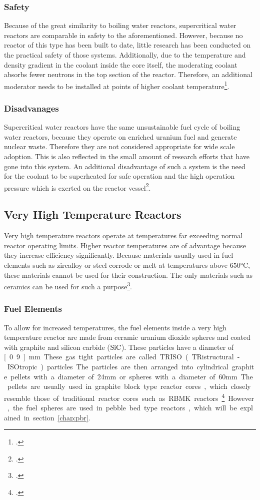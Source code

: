 \subsubsection{Safety}
Because of the great similarity to boiling water reactors, supercritical water reactors are comparable
in safety to the aforementioned. However, because no reactor of this type has been built to date,
little research has been conducted on the practical safety of those systems.
Additionally, due to the temperature and density gradient in the coolant inside the core itself,
the moderating coolant absorbs fewer neutrons in the top section of the reactor. Therefore,
an additional moderator needs to be installed at points of higher coolant temperature\footcite[52-53]{T4Gen}.
\subsubsection{Disadvanages}
Supercritical water reactors have the same unsustainable fuel cycle of boiling water reactors,
because they operate on enriched uranium fuel and generate nuclear waste. Therefore they are
not considered appropriate for wide scale adoption. This is also reflected in the small amount
of research efforts that have gone into this system.
An additional disadvantage of such a system is the need for the coolant to be superheated for
safe operation and the high operation pressure which is exerted on the reactor vessel\footcite[52-53]{T4Gen}.
\pagebreak
\subsection{Very High Temperature Reactors}
Very high temperature reactors operate at temperatures far exceeding normal reactor operating limits.
Higher reactor temperatures are of advantage because they increase efficiency significantly.
Because materials usually used in fuel elements such as zircalloy or steel corrode or melt at temperatures
above 650°C, these materials cannot be used for their construction.
The only materials such as ceramics can be used for such a purpose\footcite[55]{T4Gen}.
\subsubsection{Fuel Elements}
To allow for increased temperatures, the fuel elements inside a very high temperature reactor are made
from ceramic uranium dioxide spheres and coated with graphite and silicon carbide ($\ce{SiC}$). These
particles have a diameter of \unit[0.9]{mm}. These gas tight particles are called TRISO (TRistructural-ISOtropic) particles.
The particles are then arranged into cylindrical graphite
pellets with a diameter of 24mm or spheres with a diameter of 60mm. The pellets are usually used in
graphite block type reactor cores, which closely resemble those of traditional reactor cores such
as RBMK reactors\footcite[56]{T4Gen}. However, the fuel spheres are used in pebble bed type reactors, which will be explained
in section~\ref{chap:pbr}.
